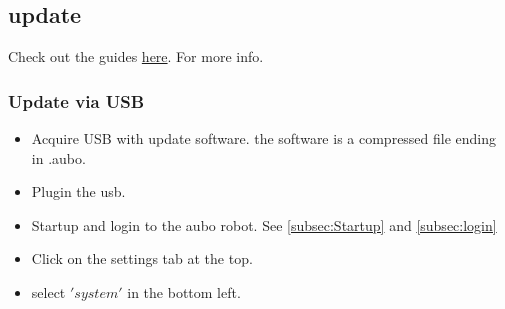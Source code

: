 \documentclass{article}
\begin{document}
\subsection{update}
Check out the guides \href{https://drive.google.com/drive/folders/1e2sAyCd5S1s4jH7FRyMwZzTy7VTZb2NE}{here}. For more info. 

\subsubsection{Update via USB}
\begin{itemize}
\item Acquire USB with update software. the software is a compressed file ending in .aubo. 
\item Plugin the usb. 
\item Startup and login to the aubo robot. See \ref{subsec:Startup} and \ref{subsec:login} 
\item Click on the settings tab at the top. 
\begin{center}
\end{center}
\item select $'system'$ in the bottom left. 
\begin{center}

\end{center}
\end{itemize}
\end{document}

